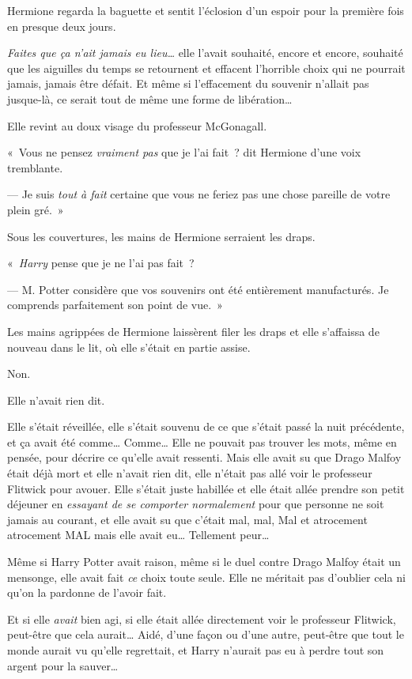 Hermione regarda la baguette et sentit l'éclosion d'un espoir pour la première fois en presque deux jours.

\emph{Faites que ça n'ait jamais eu lieu…} elle l'avait souhaité, encore et encore, souhaité que les aiguilles du temps se retournent et effacent l'horrible choix qui ne pourrait jamais, jamais être défait. Et même si l'effacement du souvenir n'allait pas jusque-là, ce serait tout de même une forme de libération…

Elle revint au doux visage du professeur McGonagall.

«~Vous ne pensez \emph{vraiment pas} que je l'ai fait~? dit Hermione d'une voix tremblante.

--- Je suis \emph{tout à fait} certaine que vous ne feriez pas une chose pareille de votre plein gré.~»

Sous les couvertures, les mains de Hermione serraient les draps.

«~\emph{Harry} pense que je ne l'ai pas fait~?

--- M. Potter considère que vos souvenirs ont été entièrement manufacturés. Je comprends parfaitement son point de vue.~»

Les mains agrippées de Hermione laissèrent filer les draps et elle s'affaissa de nouveau dans le lit, où elle s'était en partie assise.

Non.

Elle n'avait rien dit.

Elle s'était réveillée, elle s'était souvenu de ce que s'était passé la nuit précédente, et ça avait été comme… Comme… Elle ne pouvait pas trouver les mots, même en pensée, pour décrire ce qu'elle avait ressenti. Mais elle avait su que Drago Malfoy était déjà mort et elle n'avait rien dit, elle n'était pas allé voir le professeur Flitwick pour avouer. Elle s'était juste habillée et elle était allée prendre son petit déjeuner en \emph{essayant de se comporter normalement} pour que personne ne soit jamais au courant, et elle avait su que c'était mal, mal, Mal et atrocement atrocement MAL mais elle avait eu… Tellement peur…

Même si Harry Potter avait raison, même si le duel contre Drago Malfoy était un mensonge, elle avait fait \emph{ce} choix toute seule. Elle ne méritait pas d'oublier cela ni qu'on la pardonne de l'avoir fait.

Et si elle \emph{avait} bien agi, si elle était allée directement voir le professeur Flitwick, peut-être que cela aurait… Aidé, d'une façon ou d'une autre, peut-être que tout le monde aurait vu qu'elle regrettait, et Harry n'aurait pas eu à perdre tout son argent pour la sauver…

